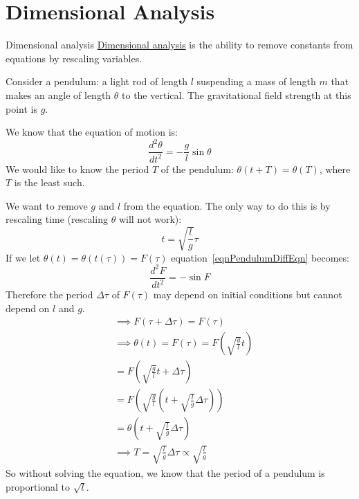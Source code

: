 \documentclass[../Main.tex]{subfiles}
\begin{document}
\section{Dimensional Analysis}
\begin{definition}{Dimensional analysis}
    \underline{Dimensional analysis} is the ability to remove constants from equations by rescaling variables.
\end{definition}
\begin{example}
    Consider a pendulum: a light rod of length $l$ suspending a mass of length $m$ that makes an angle of length $\theta$ to the vertical. The gravitational field strength at this point is $g$.\par
    We know that the equation of motion is:
    \begin{equation}
        \frac{d^2\theta}{dt^2} = -\frac{g}{l}\sin{\theta}
        \label{eqnPendulumDiffEqn}
    \end{equation}
    We would like to know the period $T$ of the pendulum: $\theta(t + T) = \theta(T)$, where $T$ is the least such.\par
    We want to remove $g$ and $l$ from the equation. The only way to do this is by rescaling time (rescaling $\theta$ will not work):
    \begin{equation*}
        t = \sqrt{\frac{l}{g}}\tau
    \end{equation*}
    If we let $\theta(t) = \theta(t(\tau)) = F(\tau)$ equation~\ref{eqnPendulumDiffEqn} becomes:
    \begin{equation*}
        \frac{d^2 F}{dt^2} = -\sin{F}
    \end{equation*}
    Therefore the period $\Delta \tau$ of $F(\tau)$ may depend on initial conditions but cannot depend on $l$ and $g$.
    \begin{align*}
        &\implies F(\tau + \Delta\tau) = F(\tau) \\
        &\implies \theta(t) = F(\tau) = F\left(\sqrt{\frac{g}{l}}t\right) \\
        &= F\left(\sqrt{\frac{g}{l}}t + \Delta\tau\right) \\
        &= F\left(\sqrt{\frac{g}{l}}\left(t + \sqrt{\frac{l}{g}} \Delta \tau\right)\right) \\
        &= \theta\left(t + \sqrt{\frac{l}{g}}\Delta\tau\right) \\
        &\implies T = \sqrt{\frac{l}{g}} \Delta \tau \propto \sqrt{\frac{l}{g}}
    \end{align*}
    So without solving the equation, we know that the period of a pendulum is proportional to $\sqrt{l}$.\par
\end{example}
\end{document}
